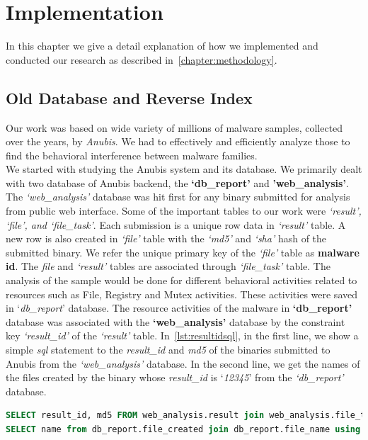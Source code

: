 \chapter{Implementation}\label{chapter:implementation}
In this chapter we give a detail explanation of how we implemented and conducted our research as described in~\autoref{chapter:methodology}.
\section{Old Database and Reverse Index}
Our work was based on wide variety of millions of malware samples, collected over the years, by \emph{Anubis}.
We had to effectively and efficiently analyze those to find the behavioral interference between malware families.\\
We started with studying the Anubis system and its database.
We primarily dealt with two database of Anubis backend, the \textbf{`db\_report'} and \textbf{'web\_analysis'}.
The \emph{`web\_analysis'} database was hit first for any binary submitted for analysis from public web interface.
Some of the important tables to our work were \emph{`result', `file', and `file\_task'}.
Each submission is a unique row data in \emph{`result'} table.
A new row is also created in \emph{`file'} table with the \emph{`md5'} and \emph{`sha'} hash of the submitted binary.
We refer the unique primary key of the \emph{`file'} table as \textbf{malware id}.
The \emph{file} and \emph{`result'} tables are associated through \emph{`file\_task'} table.
The analysis of the sample would be done for different behavioral activities related to resources such as File, Registry and Mutex activities.
These activities were saved in `\emph{db\_report}' database.
The resource activities of the malware in \textbf{`db\_report'} database was associated with the \textbf{`web\_analysis'} database by the constraint key \textit{`result\_id'} of the \emph{`result'} table.
In~\autoref{lst:resultidsql}, in the first line, we show a simple \emph{sql} statement to the \emph{result\_id} and \emph{md5} of the binaries submitted to Anubis from the \emph{`web\_analysis'} database.
In the second line, we get the names of the files created by the binary whose \emph{result\_id} is `\emph{12345}' from the \emph{`db\_report'} database.\\
\begin{lstlisting}[language=sql,caption={sql showing database structure to get file created activities of a malware sample},label={lst:resultidsql}]
SELECT result_id, md5 FROM web_analysis.result join web_analysis.file_task using (task_id) join web_analysis.file using (file_id) WHERE task_id = result_id;
SELECT name from db_report.file_created join db_report.file_name using (file_name_id) where result_id = '12345';
\end{lstlisting}

